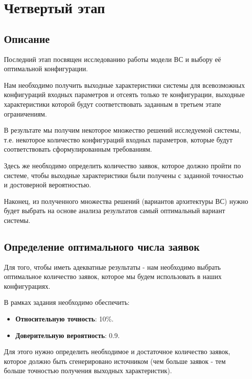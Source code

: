 \documentclass[a4paper, 14pt]{article}
\begin{document}
\section{Четвертый этап}

\subsection{Описание}

Последний этап посвящен исследованию работы модели ВС и выбору её оптимальной конфигурации.

Нам необходимо получить выходные характеристики системы для всевозможных конфигураций входных параметров и отсеять только те конфигурации, выходные характеристики которой будут соответствовать заданным в третьем этапе ограничениям.

В результате мы получим некоторое множество решений исследуемой системы, т.е. некоторое количество конфигураций входных параметров, которые будут соответствовать сформулированным требованиям.

Здесь же необходимо определить количество заявок, которое должно пройти по системе, чтобы выходные характеристики были получены с заданной точностью и достоверной вероятностью.

Наконец, из полученного множества решений (вариантов архитектуры ВС) нужно будет выбрать на основе анализа результатов самый оптимальный вариант системы.

\subsection{Определение оптимального числа заявок}

Для того, чтобы иметь адекватные результаты - нам необходимо выбрать оптимальное количество заявок, которое мы будем использовать в наших конфигурациях.

В рамках задания необходимо обеспечить:
\begin{itemize}
	\item \textbf{Относительную точность}: 10\%.
	\item \textbf{Доверительную вероятность}: 0.9.
\end{itemize}
Для этого нужно определить необходимое и достаточное количество заявок, которое должно быть сгенерировано источником (чем больше заявок - тем больше точностью получения выходных характеристик).
\end{document}
